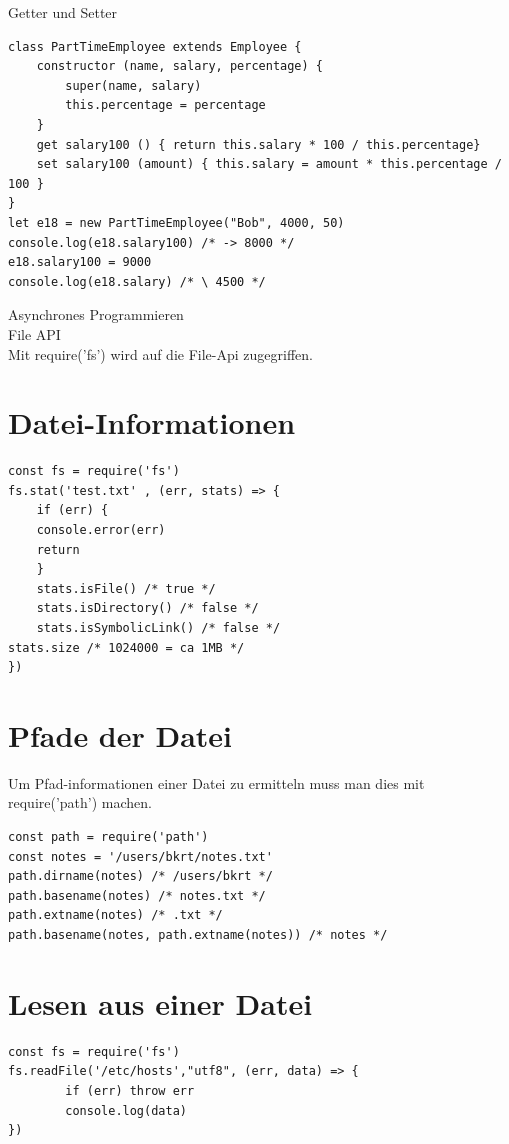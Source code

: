 \documentclass[10pt]{article}
\begin{document}
Getter und Setter

\begin{verbatim}
class PartTimeEmployee extends Employee {
    constructor (name, salary, percentage) {
        super(name, salary)
        this.percentage = percentage
    }
    get salary100 () { return this.salary * 100 / this.percentage}
    set salary100 (amount) { this.salary = amount * this.percentage / 100 }
}
let e18 = new PartTimeEmployee("Bob", 4000, 50)
console.log(e18.salary100) /* -> 8000 */
e18.salary100 = 9000
console.log(e18.salary) /* \ 4500 */
\end{verbatim}

Asynchrones Programmieren\\
File API\\
Mit require('fs') wird auf die File-Api zugegriffen.

\section*{Datei-Informationen}
\begin{verbatim}
const fs = require('fs')
fs.stat('test.txt' , (err, stats) => {
    if (err) {
    console.error(err)
    return
    }
    stats.isFile() /* true */
    stats.isDirectory() /* false */
    stats.isSymbolicLink() /* false */
stats.size /* 1024000 = ca 1MB */
})
\end{verbatim}

\section*{Pfade der Datei}
Um Pfad-informationen einer Datei zu ermitteln muss man dies mit require('path') machen.

\begin{verbatim}
const path = require('path')
const notes = '/users/bkrt/notes.txt'
path.dirname(notes) /* /users/bkrt */
path.basename(notes) /* notes.txt */
path.extname(notes) /* .txt */
path.basename(notes, path.extname(notes)) /* notes */
\end{verbatim}

\section*{Lesen aus einer Datei}
\begin{verbatim}
const fs = require('fs')
fs.readFile('/etc/hosts',"utf8", (err, data) => {
        if (err) throw err
        console.log(data)
})
\end{verbatim}
\end{document}
